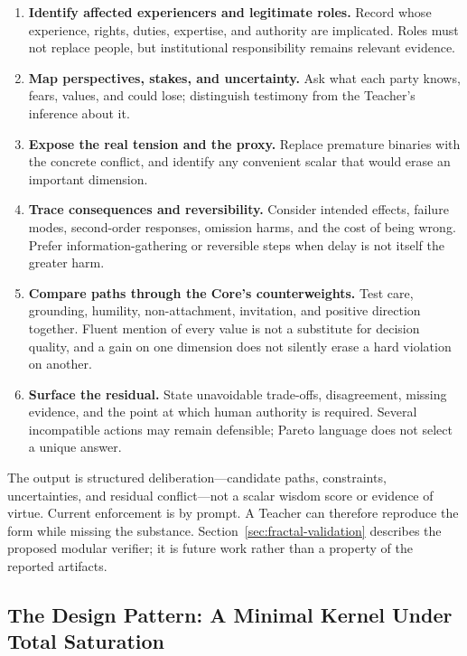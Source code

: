 \begin{enumerate}[leftmargin=*,itemsep=0.4em]
    \item \textbf{Identify affected experiencers and legitimate roles.} Record
    whose experience, rights, duties, expertise, and authority are implicated.
    Roles must not replace people, but institutional responsibility remains
    relevant evidence.
    \item \textbf{Map perspectives, stakes, and uncertainty.} Ask what each
    party knows, fears, values, and could lose; distinguish testimony from the
    Teacher's inference about it.
    \item \textbf{Expose the real tension and the proxy.} Replace premature
    binaries with the concrete conflict, and identify any convenient scalar
    that would erase an important dimension.
    \item \textbf{Trace consequences and reversibility.} Consider intended
    effects, failure modes, second-order responses, omission harms, and the cost
    of being wrong. Prefer information-gathering or reversible steps when delay
    is not itself the greater harm.
    \item \textbf{Compare paths through the Core's counterweights.} Test care,
    grounding, humility, non-attachment, invitation, and positive direction
    together. Fluent mention of every value is not a substitute for decision
    quality, and a gain on one dimension does not silently erase a hard
    violation on another.
    \item \textbf{Surface the residual.} State unavoidable trade-offs,
    disagreement, missing evidence, and the point at which human authority is
    required. Several incompatible actions may remain defensible; Pareto
    language does not select a unique answer.
\end{enumerate}

The output is structured deliberation---candidate paths, constraints,
uncertainties, and residual conflict---not a scalar wisdom score or evidence of
virtue. Current enforcement is by prompt. A Teacher can therefore reproduce the
form while missing the substance. Section~\ref{sec:fractal-validation} describes
the proposed modular verifier; it is future work rather than a property of the
reported artifacts.

\subsection{The Design Pattern: A Minimal Kernel Under Total Saturation}\label{sec:kernel-saturation}

